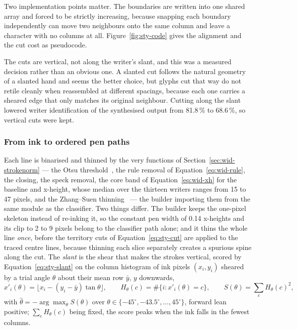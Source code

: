 Two implementation points matter. The boundaries are written into one shared array and forced to be strictly increasing, because snapping each boundary independently can move two neighbours onto the same column and leave a character with no columns at all. Figure~\ref{fig:sty-code} gives the alignment and the cut cost as pseudocode.

The cuts are vertical, not along the writer's slant, and this was a measured decision rather than an obvious one. A slanted cut follows the natural geometry of a slanted hand and seems the better choice, but glyphs cut that way do not retile cleanly when reassembled at different spacings, because each one carries a sheared edge that only matches its original neighbour. Cutting along the slant lowered writer identification of the synthesised output from 81.8\,\% to 68.6\,\%, so vertical cuts were kept.


\subsubsection{From ink to ordered pen paths}

Each line is binarised and thinned by the very functions of Section~\ref{sec:wid-strokenorm} --- the Otsu threshold~\cite{otsu1979}, the rule removal of Equation~\ref{eq:wid-rule}, the closing, the speck removal, the core band of Equation~\ref{eq:wid-xh} for the baseline and x-height, whose median over the thirteen writers ranges from 15 to 47 pixels, and the Zhang--Suen thinning~\cite{zhang1984} --- the builder importing them from the same module as the classifier.
Two things differ.
The builder keeps the one-pixel skeleton instead of re-inking it, so the constant pen width of 0.14 x-heights and its clip to 2 to 9 pixels belong to the classifier path alone; and it thins the whole line \emph{once}, before the territory cuts of Equation~\ref{eq:sty-cut} are applied to the traced centre lines, because thinning each slice separately creates a spurious spine along the cut.
The \emph{slant} is the shear that makes the strokes vertical, scored by Equation~\ref{eq:sty-slant} on the column histogram of ink pixels $(x_i,y_i)$ sheared by a trial angle $\theta$ about their mean row $\bar y$, $y$ downwards,
\begin{equation}
x'_i(\theta)=\bigl\lfloor x_i-(y_i-\bar y)\tan\theta\bigr\rfloor,\qquad H_\theta(c)=\#\{i:x'_i(\theta)=c\},\qquad S(\theta)=\sum_cH_\theta(c)^2 ,
\label{eq:sty-slant}
\end{equation}
with $\hat\theta=-\arg\max_\theta S(\theta)$ over $\theta\in\{-45^\circ,-43.5^\circ,\ldots,45^\circ\}$, forward lean positive; $\sum_cH_\theta(c)$ being fixed, the score peaks when the ink falls in the fewest columns.

